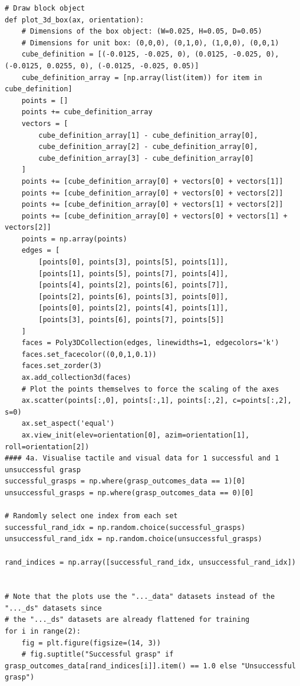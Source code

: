 \documentclass[11pt, a4paper]{report}
\begin{document}
\begin{lstlisting}
# Draw block object
def plot_3d_box(ax, orientation):
    # Dimensions of the box object: (W=0.025, H=0.05, D=0.05)
    # Dimensions for unit box: (0,0,0), (0,1,0), (1,0,0), (0,0,1)
    cube_definition = [(-0.0125, -0.025, 0), (0.0125, -0.025, 0), (-0.0125, 0.0255, 0), (-0.0125, -0.025, 0.05)]
    cube_definition_array = [np.array(list(item)) for item in cube_definition]
    points = []
    points += cube_definition_array
    vectors = [
        cube_definition_array[1] - cube_definition_array[0],
        cube_definition_array[2] - cube_definition_array[0],
        cube_definition_array[3] - cube_definition_array[0]
    ]
    points += [cube_definition_array[0] + vectors[0] + vectors[1]]
    points += [cube_definition_array[0] + vectors[0] + vectors[2]]
    points += [cube_definition_array[0] + vectors[1] + vectors[2]]
    points += [cube_definition_array[0] + vectors[0] + vectors[1] + vectors[2]]
    points = np.array(points)
    edges = [
        [points[0], points[3], points[5], points[1]],
        [points[1], points[5], points[7], points[4]],
        [points[4], points[2], points[6], points[7]],
        [points[2], points[6], points[3], points[0]],
        [points[0], points[2], points[4], points[1]],
        [points[3], points[6], points[7], points[5]]
    ]
    faces = Poly3DCollection(edges, linewidths=1, edgecolors='k')
    faces.set_facecolor((0,0,1,0.1))
    faces.set_zorder(3)
    ax.add_collection3d(faces)
    # Plot the points themselves to force the scaling of the axes
    ax.scatter(points[:,0], points[:,1], points[:,2], c=points[:,2], s=0)
    ax.set_aspect('equal')
    ax.view_init(elev=orientation[0], azim=orientation[1], roll=orientation[2])
#### 4a. Visualise tactile and visual data for 1 successful and 1 unsuccessful grasp
successful_grasps = np.where(grasp_outcomes_data == 1)[0]
unsuccessful_grasps = np.where(grasp_outcomes_data == 0)[0]

# Randomly select one index from each set
successful_rand_idx = np.random.choice(successful_grasps)
unsuccessful_rand_idx = np.random.choice(unsuccessful_grasps)

rand_indices = np.array([successful_rand_idx, unsuccessful_rand_idx])


# Note that the plots use the "..._data" datasets instead of the "..._ds" datasets since 
# the "..._ds" datasets are already flattened for training
for i in range(2):
    fig = plt.figure(figsize=(14, 3))
    # fig.suptitle("Successful grasp" if grasp_outcomes_data[rand_indices[i]].item() == 1.0 else "Unsuccessful grasp")
    

\end{lstlisting}
\end{document}
